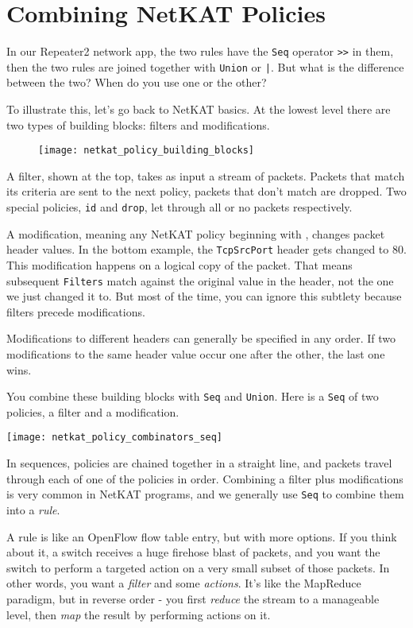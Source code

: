 \section{Combining NetKAT Policies}
\label{section:combining}

In our Repeater2 network app, the two rules have the \texttt{Seq} operator \texttt{>>} in them, then the two rules 
are joined together with \texttt{Union} or \texttt{|}.  
But what is the difference between the two?
When do you use one or the other?

To illustrate this, let's go back to NetKAT basics.  At the lowest level there are two types
of building blocks: filters and modifications.  

\begin{figure}[h]
\centering
\texttt{[image: netkat\_policy\_building\_blocks]}
\end{figure}

A filter, shown at the top, takes as input a stream of packets.  Packets that match its criteria are
sent to the next policy, packets that don't match are dropped.  Two special policies, 
\texttt{id} and \texttt{drop}, let through all or no packets respectively.  

A modification, meaning any NetKAT policy beginning with , 
changes packet header values.  In the bottom example, the \texttt{TcpSrcPort} header gets
changed to 80.  This modification happens on a logical copy of the packet.  That means subsequent \texttt{Filters} 
match against the original  
value in the header, not the one we just changed it to.  But most of the 
time, you can ignore this subtlety because filters precede modifications.

Modifications to different headers can generally be specified in any order.  If two modifications to the same header 
value occur one after the other, the last one wins.  

You combine these building blocks with \texttt{Seq} and \texttt{Union}.
Here is a \texttt{Seq} of two policies, a filter and a modification.   

\texttt{[image: netkat\_policy\_combinators\_seq]}

In sequences, policies
are chained together in a straight line, and packets travel through each of one of the policies in order.  
Combining a filter plus modifications is very common in NetKAT programs, and we generally
use \texttt{Seq} to combine them into a \emph{rule}.  

A rule is like an OpenFlow flow table entry, but with more options.  
If you think about it, a switch receives a huge firehose blast of packets, and you want the switch to 
perform a targeted action on a very small subset of those packets. 
In other words, you want a \emph{filter} and some \emph{actions}.
It's like the MapReduce paradigm, but in reverse order - you first \emph{reduce} the stream to a manageable level,
then \emph{map} the result by performing actions on it.  

